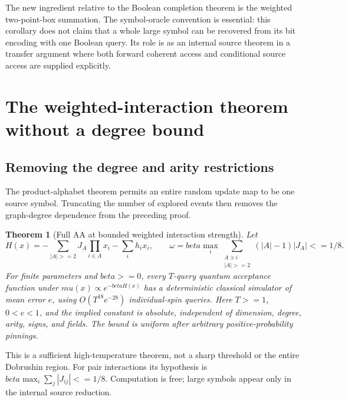 \documentclass[11pt]{article}
\newtheorem{theorem}{Theorem}[section]
\theoremstyle{definition}
\theoremstyle{remark}
\def\beta{beta}\def\gamma{gamma}\def\lambda{lambda}%
\def\mu{mu}\def\rho{rho}\def\le{<=}\def\ge{>=}%
\begin{document}
The new ingredient relative to the Boolean completion theorem is the
weighted two-point-box summation. The symbol-oracle convention is
essential: this corollary does not claim that a whole large symbol can
be recovered from its bit encoding with one Boolean query. Its role
is as an internal source theorem in a transfer argument where both
forward coherent access and conditional source access are supplied
explicitly.

\section{The weighted-interaction theorem without a degree bound}

\subsection{Removing the degree and arity restrictions}
\label{resolution-dynamics:arbitrary-degree}

The product-alphabet theorem permits an entire random update map to be
one source symbol. Truncating the number of explored events then removes
the graph-degree dependence from the preceding proof.

\begin{theorem}[Full AA at bounded weighted interaction strength]
\label{thm:resolution-dynamics-arbitrary-degree}
Let
\[
 H(x)=-\sum_{|A|\ge2}J_A\prod_{i\in A}x_i-\sum_i h_ix_i,
 \qquad
 \omega=\beta\max_i\sum_{\substack{A\ni i\\|A|\ge2}}
                       (|A|-1)|J_A|\le1/8.
\]
For finite parameters and \(\beta\ge0\), every \(T\)-query quantum
acceptance function under \(\mu(x)\propto e^{-\beta H(x)}\) has a
deterministic classical simulator of mean error \(e\), using
\(O(T^{18}e^{-28})\) individual-spin queries. Here \(T\ge1\),
\(0<e<1\), and the implied constant is absolute, independent of
dimension, degree, arity, signs, and fields. The bound is uniform after
arbitrary positive-probability pinnings.
\end{theorem}

This is a sufficient high-temperature theorem, not a sharp threshold
or the entire Dobrushin region. For pair interactions its hypothesis is
\(\beta\max_i\sum_j|J_{ij}|\le1/8\). Computation is free; large
symbols appear only in the internal source reduction.
\end{document}
